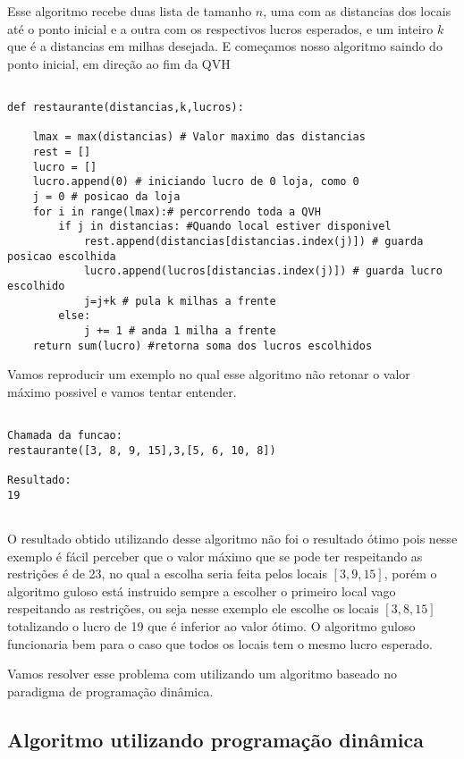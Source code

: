 \documentclass[11pt]{article}
\begin{document}
\label{sec-3-3}

Esse algoritmo recebe duas lista de tamanho $n$, uma com as distancias dos locais até o ponto inicial e a outra com os respectivos lucros esperados, e um inteiro $k$ que é a distancias em milhas desejada.  
E começamos nosso algoritmo saindo do ponto inicial, em direção ao fim da QVH 

\begin{verbatim}

def restaurante(distancias,k,lucros):
    
    lmax = max(distancias) # Valor maximo das distancias
    rest = []
    lucro = []
    lucro.append(0) # iniciando lucro de 0 loja, como 0
    j = 0 # posicao da loja
    for i in range(lmax):# percorrendo toda a QVH 
        if j in distancias: #Quando local estiver disponivel
            rest.append(distancias[distancias.index(j)]) # guarda posicao escolhida
            lucro.append(lucros[distancias.index(j)]) # guarda lucro escolhido
            j=j+k # pula k milhas a frente
        else:
            j += 1 # anda 1 milha a frente
    return sum(lucro) #retorna soma dos lucros escolhidos

\end{verbatim}

Vamos reproducir um exemplo no qual esse algoritmo não retonar o valor máximo possivel e vamos tentar entender.

\begin{verbatim}

Chamada da funcao:
restaurante([3, 8, 9, 15],3,[5, 6, 10, 8])

Resultado:
19
 
\end{verbatim}

O resultado obtido utilizando desse algoritmo não foi o resultado ótimo pois nesse exemplo é fácil perceber que o valor máximo 
que se pode ter respeitando as restrições é de 23, no qual a escolha seria feita pelos locais $[3, 9, 15]$, porém o algoritmo guloso 
está instruido sempre a escolher o primeiro local vago respeitando as restrições, ou seja nesse exemplo ele escolhe os locais $[3, 8, 15]$ 
totalizando o lucro de 19 que é inferior ao valor ótimo. O algoritmo guloso funcionaria bem para o caso que todos os locais tem o mesmo
lucro esperado. 

Vamos resolver esse problema com utilizando um algoritmo baseado no paradigma de programação dinâmica.

\subsection{Algoritmo utilizando programação dinâmica}
\end{document}

